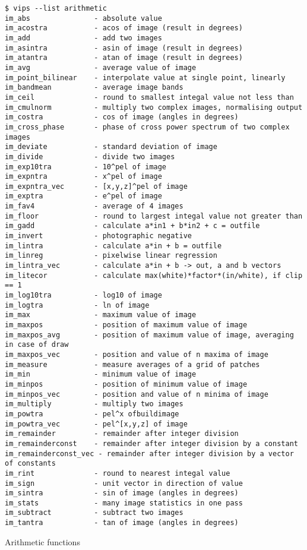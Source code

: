 \begin{fig2}
\begin{verbatim}
$ vips --list arithmetic
im_abs               - absolute value
im_acostra           - acos of image (result in degrees)
im_add               - add two images
im_asintra           - asin of image (result in degrees)
im_atantra           - atan of image (result in degrees)
im_avg               - average value of image
im_point_bilinear    - interpolate value at single point, linearly
im_bandmean          - average image bands
im_ceil              - round to smallest integal value not less than
im_cmulnorm          - multiply two complex images, normalising output
im_costra            - cos of image (angles in degrees)
im_cross_phase       - phase of cross power spectrum of two complex images
im_deviate           - standard deviation of image
im_divide            - divide two images
im_exp10tra          - 10^pel of image
im_expntra           - x^pel of image
im_expntra_vec       - [x,y,z]^pel of image
im_exptra            - e^pel of image
im_fav4              - average of 4 images
im_floor             - round to largest integal value not greater than
im_gadd              - calculate a*in1 + b*in2 + c = outfile
im_invert            - photographic negative
im_lintra            - calculate a*in + b = outfile
im_linreg            - pixelwise linear regression
im_lintra_vec        - calculate a*in + b -> out, a and b vectors
im_litecor           - calculate max(white)*factor*(in/white), if clip == 1
im_log10tra          - log10 of image
im_logtra            - ln of image
im_max               - maximum value of image
im_maxpos            - position of maximum value of image
im_maxpos_avg        - position of maximum value of image, averaging in case of draw
im_maxpos_vec        - position and value of n maxima of image
im_measure           - measure averages of a grid of patches
im_min               - minimum value of image
im_minpos            - position of minimum value of image
im_minpos_vec        - position and value of n minima of image
im_multiply          - multiply two images
im_powtra            - pel^x ofbuildimage
im_powtra_vec        - pel^[x,y,z] of image
im_remainder         - remainder after integer division
im_remainderconst    - remainder after integer division by a constant
im_remainderconst_vec - remainder after integer division by a vector of constants
im_rint              - round to nearest integal value
im_sign              - unit vector in direction of value
im_sintra            - sin of image (angles in degrees)
im_stats             - many image statistics in one pass
im_subtract          - subtract two images
im_tantra            - tan of image (angles in degrees)
\end{verbatim}
\caption{Arithmetic functions}
\label{fg:arithmetic}
\end{fig2}

